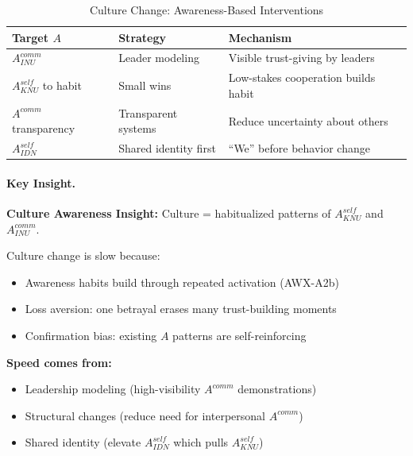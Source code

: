 \begin{table}[htbp]
\centering
\caption{Culture Change: Awareness-Based Interventions}
\label{tab:culture-intervention}
\renewcommand{\arraystretch}{1.3}
\begin{tabular}{@{}lll@{}}
\toprule
\textbf{Target $A$} & \textbf{Strategy} & \textbf{Mechanism} \\
\midrule
$A^{comm}_{INU}$ & Leader modeling & Visible trust-giving by leaders \\
$A^{self}_{KNU}$ to habit & Small wins & Low-stakes cooperation builds habit \\
$A^{comm}$ transparency & Transparent systems & Reduce uncertainty about others \\
$A^{self}_{IDN}$ & Shared identity first & ``We'' before behavior change \\
\bottomrule
\end{tabular}
\end{table}

\paragraph{Key Insight.}
\begin{tcolorbox}[colback=yellow!10!white, colframe=yellow!50!black]
\textbf{Culture Awareness Insight:}
Culture = habitualized patterns of $A^{self}_{KNU}$ and $A^{comm}_{INU}$.

Culture change is slow because:
\begin{itemize}
\item Awareness habits build through repeated activation (AWX-A2b)
\item Loss aversion: one betrayal erases many trust-building moments
\item Confirmation bias: existing $A$ patterns are self-reinforcing
\end{itemize}

\textbf{Speed comes from:}
\begin{itemize}
\item Leadership modeling (high-visibility $A^{comm}$ demonstrations)
\item Structural changes (reduce need for interpersonal $A^{comm}$)
\item Shared identity (elevate $A^{self}_{IDN}$ which pulls $A^{self}_{KNU}$)
\end{itemize}
\end{tcolorbox}

